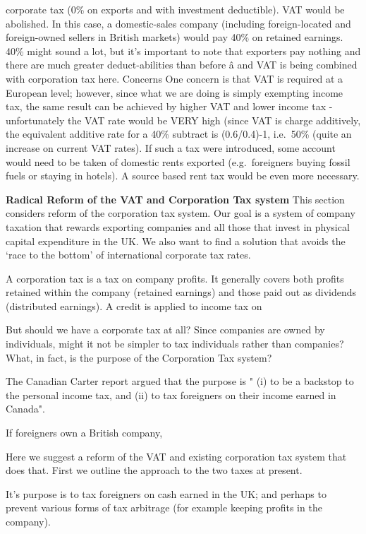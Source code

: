 \documentclass[]{tufte-handout}
\begin{document}
corporate tax (0\% on exports and with investment deductible). VAT would
be abolished. In this case, a domestic-sales company (including
foreign-located and foreign-owned sellers in British markets) would pay
40\% on retained earnings. 40\% might sound a lot, but it's important to
note that exporters pay nothing and there are much greater
deduct-abilities than before â and VAT is being combined with
corporation tax here. Concerns One concern is that VAT is required at a
European level; however, since what we are doing is simply exempting
income tax, the same result can be achieved by higher VAT and lower
income tax - unfortunately the VAT rate would be VERY high (since VAT is
charge additively, the equivalent additive rate for a 40\% subtract is
(0.6/0.4)-1, i.e.~50\% (quite an increase on current VAT rates). If such
a tax were introduced, some account would need to be taken of domestic
rents exported (e.g.~foreigners buying fossil fuels or staying in
hotels). A source based rent tax would be even more necessary.

\textbf{Radical Reform of the VAT and Corporation Tax system} This
section considers reform of the corporation tax system. Our goal is a
system of company taxation that rewards exporting companies and all
those that invest in physical capital expenditure in the UK. We also
want to find a solution that avoids the `race to the bottom' of
international corporate tax rates.

A corporation tax is a tax on company profits. It generally covers both
profits retained within the company (retained earnings) and those paid
out as dividends (distributed earnings). A credit is applied to income
tax on

But should we have a corporate tax at all? Since companies are owned by
individuals, might it not be simpler to tax individuals rather than
companies? What, in fact, is the purpose of the Corporation Tax system?

The Canadian Carter report argued that the purpose is " (i) to be a
backstop to the personal income tax, and (ii) to tax foreigners on their
income earned in Canada".

If foreigners own a British company,

Here we suggest a reform of the VAT and existing corporation tax system
that does that. First we outline the approach to the two taxes at
present.

It's purpose is to tax foreigners on cash earned in the UK; and perhaps
to prevent various forms of tax arbitrage (for example keeping profits
in the company).
\end{document}
